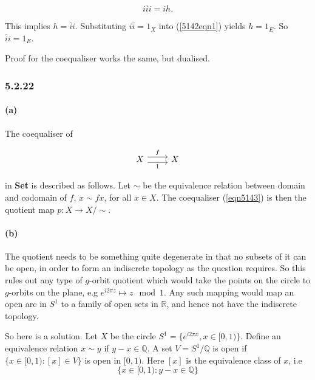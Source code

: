 \documentclass{article}
\begin{document}
\begin{equation}
  \label{5142eqn1}
  i\overline{i}i=ih.
\end{equation}

This implies $h=\overline{i}i$. Substituting $i\overline{i}=1_X$ into (\ref{5142eqn1}) yields $h=1_E$. So $\overline{i}i = 1_E$.

Proof for the coequaliser works the same, but dualised.

\subsubsection*{5.2.22}

\paragraph{(a)}

The coequaliser of

\begin{equation}
\label{eqn5143}
\begin{tikzcd}
  X \ar[r,shift left=.75ex,"f"]
    \ar[r,shift right=.75ex,swap,"1"] & X
\end{tikzcd}
\end{equation}

in \textbf{Set} is described as follows. Let $\sim$ be the equivalence relation between domain and codomain of $f$, $x \sim fx$, for all $x \in X$. The coequaliser (\ref{eqn5143}) is then the quotient map $p\colon X \rightarrow X/\sim$.

\paragraph{(b)}

The quotient needs to be something quite degenerate in that no subsets of it can be open, in order to form an indiscrete topology as the question requires. So this rules out any type of $g$-orbit quotient which would take the points on the circle to $g$-orbits on the plane, e.g $e^{i2\pi z} \mapsto z \mod 1$. Any such mapping would map an open arc in $S^1$ to a family of open sets in $\mathds{R}$, and hence not have the indiscrete topology.

So here is a solution. Let $X$ be the circle $S^1= \{e^{i2\pi x}, x \in [0,1)\}$. Define an equivalence relation $x \sim y$ if $y - x \in \mathds{Q}$. A set $V=S^1/\mathds{Q}$ is open if $\{x \in [0,1)\colon [x] \in V \}$ is open in $[0,1)$. Here $[x]$ is the equivalence class of $x$, i.e
\begin{equation*}
  \{ x \in [0,1)\colon y - x \in \mathds{Q} \}
\end{equation*}
\end{document}
